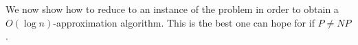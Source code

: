 We now show how to reduce \ProbStar{} to an instance of the \ProblemSetCover{} problem
in order to obtain a $O(\log n)$-approximation algorithm.
This is the best one can hope for if $P \neq NP$.